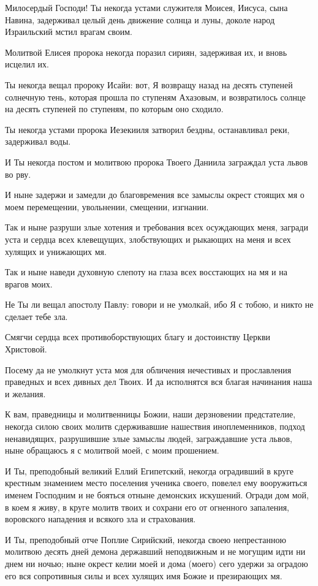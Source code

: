\documentclass[12pt,twoside,xdvi,a6paper,civil=times]{hipbook}
\renewcommand{\*}{\raise3pt\hbox{\footnotesize*}}
\begin{document}
Милосердый Господи! Ты некогда устами служителя Моисея, Иисуса, сына Навина,
задерживал целый день движение солнца и луны, доколе народ Израильский мстил
врагам своим.

Молитвой Елисея пророка некогда поразил сириян, задерживая их, и вновь исцелил
их.

Ты некогда вещал пророку Исайи: вот, Я возвращу назад на десять ступеней
солнечную тень, которая прошла по ступеням Ахазовым, и возвратилось солнце на
десять ступеней по ступеням, по которым оно сходило.

Ты некогда устами пророка Иезекииля затворил бездны, останавливал реки,
задерживал воды.

И Ты некогда постом и молитвою пророка Твоего Даниила заграждал уста львов во
рву.

И ныне задержи и замедли до благовремения все замыслы окрест стоящих мя о моем
перемещении, увольнении, смещении, изгнании.

Так и ныне разруши злые хотения и требования всех осуждающих меня, загради
уста и сердца всех клевещущих, злобствующих и рыкающих на меня и всех хулящих
и унижающих мя.

Так и ныне наведи духовную слепоту на глаза всех восстающих на мя и на врагов
моих.

Не Ты ли вещал апостолу Павлу: говори и не умолкай, ибо Я с тобою, и никто не
сделает тебе зла.

Смягчи сердца всех противоборствующих благу и достоинству Церкви Христовой.

Посему да не умолкнут уста моя для обличения нечестивых и прославления
праведных и всех дивных дел Твоих. И да исполнятся вся благая начинания наша и
желания.

К вам, праведницы и молитвенницы Божии, наши дерзновении предстателие, некогда
силою своих молитв сдерживавшие нашествия иноплеменников, подход ненавидящих,
разрушившие злые замыслы людей, заграждавшие уста львов, ныне обращаюсь я с
молитвой моей, с моим прошением.

И Ты, преподобный великий Еллий Египетский, некогда оградивший в круге
крестным знамением место поселения ученика своего, повелел ему вооружиться
именем Господним и не бояться отныне демонских искушений. Огради дом мой, в
коем я живу, в круге молитв твоих и сохрани его от огненного запаления,
воровского нападения и всякого зла и страхования.

И Ты, преподобный отче Поплие Сирийский, некогда своею непрестанною молитвою
десять дней демона державший неподвижным и не могущим идти ни днем ни ночью;
ныне окрест келии моей и дома (моего) сего удержи за оградою его вся
сопротивныя силы и всех хулящих имя Божие и презирающих мя.
\end{document}
